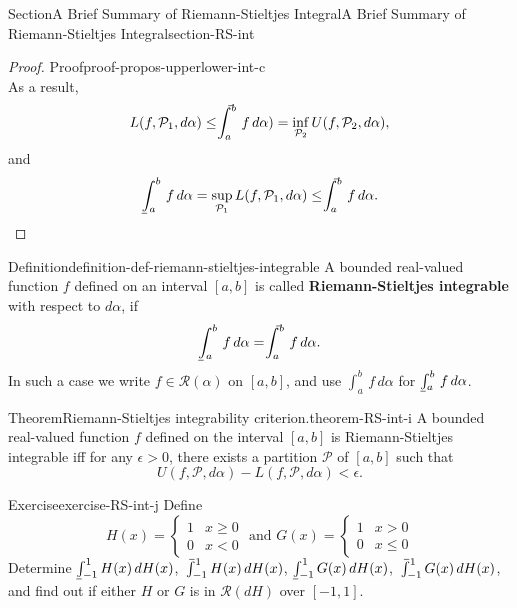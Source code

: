 \documentclass[oneside,10pt,]{article}
\makeatletter
\newcommand{\terminology}[1]{\textbf{#1}}
\numberwithin{equation}{section}
\newcommand{\qedhere}{\relax}
\newcommand{\cP}{\mathcal{P}}
\newcommand{\cR}{\mathcal{R}}
\def\upint{\mathchoice
    {\mkern10mu\overline{\vphantom{\intop}\mkern7mu}\mkern-24mu}
    {\mkern7mu\overline{\vphantom{\intop}\mkern7mu}\mkern-14mu}
    {\mkern7mu\overline{\vphantom{\intop}\mkern7mu}\mkern-14mu}
    {\mkern7mu\overline{\vphantom{\intop}\mkern7mu}\mkern-14mu}
  \int}
\def\lowint{\relax\if@display
 \mkern3mu\underline{\vphantom{\intop}\mkern7mu}\mkern-10mu\int
\else 
\underline{\vphantom{\int}\mkern7mu}\mkern-10mu\int
\fi}
\newcommand{\amp}{&}
\makeatother
\begin{document}
\begin{sectionptx}{Section}{A Brief Summary of Riemann-Stieltjes Integral}{}{A Brief Summary of Riemann-Stieltjes Integral}{}{}{section-RS-int}
\begin{proof}{Proof}{}{proof-propos-upperlower-int-c}
\begin{equation*}
\end{equation*}
As a result,%
\begin{equation*}
L(f, \cP_{1}, d \alpha)\le  \upint_a^b \,f\, d \alpha) =\inf_{\cP_{2}} U(f, \cP_{2}, d \alpha),
\end{equation*}
and%
\begin{equation*}
\lowint_a^b \,f\, d \alpha =\sup_{\cP_{1}} L(f, \cP_{1}, d \alpha)\le \upint_a^b \,f\, d \alpha.\qedhere
\end{equation*}
%
\end{proof}
\begin{definition}{Definition}{}{definition-def-riemann-stieltjes-integrable}%
%
\label{notation-def-riemann-stieltjes-integrable-b}%
A bounded real-valued function \(f\) defined on an interval \([a, b]\) is called \terminology{Riemann-Stieltjes integrable} with respect to \(d\alpha\), if%
\begin{equation*}
\lowint_a^b\,f\, d\alpha =  \upint_a^b\,f\, d\alpha.
\end{equation*}
In such a case we write \(f\in \cR(\alpha)\) on \([a, b]\), and use \(\int_{a}^{b} \,f\, d\alpha\) for \(\lowint_a^b\,f\, d\alpha \).%
\end{definition}
\begin{theorem}{Theorem}{Riemann-Stieltjes integrability criterion.}{}{theorem-RS-int-i}%
A bounded real-valued function \(f\) defined on the interval \([a, b]\) is Riemann-Stieltjes integrable iff for any \(\epsilon > 0\), there exists a partition \(\cP\) of \([a, b]\) such that%
\begin{equation}
U(f, \cP, d\alpha) - L(f, \cP, d\alpha) < \epsilon.\label{men-RS-IntC}
\end{equation}
\end{theorem}
\begin{inlineexercise}{Exercise}{}{exercise-RS-int-j}%
Define%
\begin{equation*}
H(x)=\begin{cases} 1 \amp x \ge 0 \\ 0 \amp x < 0 
\end{cases}
\text{ and }
G(x) =\begin{cases} 1 \amp x > 0 \\ 0 \amp x \le 0 
\end{cases} 
\end{equation*}
Determine \(\lowint_{-1}^{1} H(x)\, dH(x)\), \(\upint_{-1}^{1} H(x)\, dH(x)\), \(\lowint_{-1}^{1} G(x)\, dH(x)\), \(\upint_{-1}^{1} G(x)\, dH(x)\), and find out if either \(H\) or \(G\) is in \(\cR(dH)\) over \([-1, 1]\).%

\end{inlineexercise}
\end{sectionptx}
\end{document}
